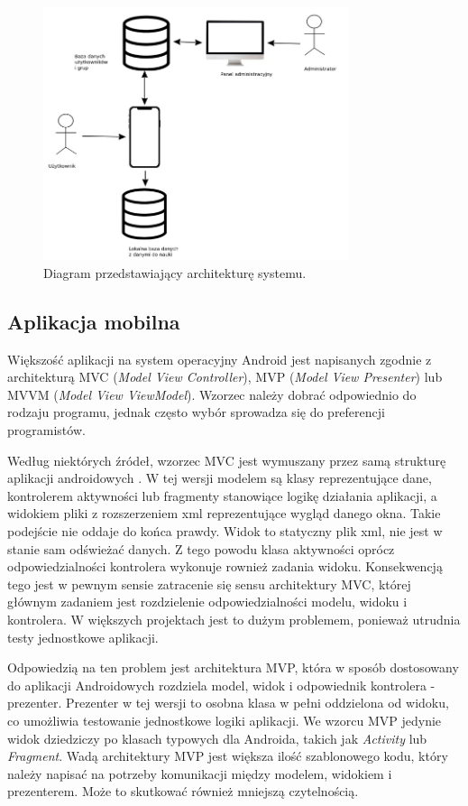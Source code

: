 \documentclass[a4paper,twoside,12pt]{book}
\newcommand{\obcy}[1]{\emph{#1}}
\newcommand{\english}[1]{{\selectlanguage{british}\obcy{#1}}}
\begin{document}
\begin{figure}[]
\centering
\includegraphics[width=0.8\textwidth]{archi}
\caption{Diagram przedstawiający architekturę systemu.}
\label{fig:archi}
\end{figure}

\subsection{Aplikacja mobilna}

Większość aplikacji na system operacyjny Android jest napisanych zgodnie z architekturą MVC (\english{Model View Controller}), MVP (\english{Model View Presenter}) lub MVVM (\english{Model View ViewModel}). Wzorzec należy dobrać odpowiednio do rodzaju programu, jednak często wybór sprowadza się do preferencji programistów. 

Według niektórych źródeł, wzorzec MVC jest wymuszany przez samą strukturę aplikacji androidowych \cite{bib:internetMVC}. W tej wersji modelem są klasy reprezentujące dane, kontrolerem aktywności lub fragmenty stanowiące logikę działania aplikacji, a widokiem pliki z rozszerzeniem xml reprezentujące wygląd danego okna. Takie podejście nie oddaje do końca prawdy. Widok to statyczny plik xml, nie jest w stanie sam odświeżać danych. Z tego powodu klasa aktywności oprócz odpowiedzialności kontrolera wykonuje rownież zadania widoku. Konsekwencją tego jest w pewnym sensie zatracenie się sensu architektury MVC, której głównym zadaniem jest rozdzielenie odpowiedzialności modelu, widoku i kontrolera. W większych projektach jest to dużym problemem, ponieważ utrudnia testy jednostkowe aplikacji.

Odpowiedzią na ten problem jest architektura MVP, która w sposób dostosowany do aplikacji Androidowych rozdziela model, widok i odpowiednik kontrolera - prezenter. Prezenter w tej wersji to osobna klasa w pełni oddzielona od widoku, co umożliwia testowanie jednostkowe logiki aplikacji. We wzorcu MVP jedynie widok dziedziczy po klasach typowych dla Androida, takich jak \english{Activity} lub \english{Fragment}. Wadą architektury MVP jest większa ilość szablonowego kodu, który należy napisać na potrzeby komunikacji między modelem, widokiem i prezenterem. Może to skutkować również mniejszą czytelnością.
\end{document}
